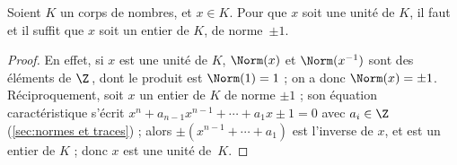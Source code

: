 \documentclass[11pt, %
  title in boldface,
  theorem in new line,
  theorem numbering = section,
  number theorems separately,
  simple name,
]{beaulivre}
\begin{document}
    \begin{proposition}\label{prop:unité est de norme +-1}
        Soient \( K \) un corps de nombres, et \( x \in K \). Pour que \( x \) soit une unité de \( K \), il faut et il suffit que \( x \) soit un entier de \( K \), de norme~\( \pm 1 \).
    \end{proposition}
    \begin{proof}
        En effet, si \( x \) est une unité de \( K \), \( \Norm(x) \) et \( \Norm(x^{-1}) \) sont des éléments de \( \Z \)\,, dont le produit est \( \Norm(1) = 1 \) ; on a donc \( \Norm(x) = \pm 1 \). Réciproquement, soit \( x \) un entier de \( K \) de norme \( \pm 1 \) ; son équation caractéristique s'écrit \( x^n + a_{n-1} x^{n-1} + \cdots + a_1 x \pm 1 = 0 \) avec \( a_i \in \Z \) (\cref{sec:normes et traces}) ; alors \( \pm (x^{n-1} + \cdots + a_1) \) est l'inverse de \( x \), et est un entier de \( K \) ; donc \( x \) est une unité de~\( K \).
    \end{proof}
\end{document}
